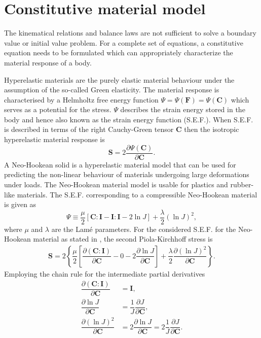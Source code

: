 \section{Constitutive material model}
\label{sec:const_law}
The kinematical relations and balance laws are not sufficient to solve a boundary value or initial value problem. For a complete set of equations, a constitutive equation needs to be formulated which can appropriately characterize the material response of a body. \par 

Hyperelastic materials are the purely elastic material behaviour under the assumption of the so-called Green elasticity. The material response is characterised by a Helmholtz free energy function $\Psi = \Psi(\mathbf{F}) = \Psi(\mathbf{C}) $ which serves as a potential for the stress. $\Psi$ describes the strain energy stored in the body and hence also known as the strain energy function (S.E.F.). When S.E.F. is described in terms of the right Cauchy-Green tensor $\mathbf{C}$ then the isotropic hyperelastic material response is 
\begin{equation}
\mathbf{S} = 2 \dfrac{\partial \Psi (\mathbf{C})}{\partial \mathbf{C}}.
\end{equation}
A Neo-Hookean solid is a hyperelastic material model that can be used for predicting the non-linear behaviour of materials undergoing large deformations under loads. The Neo-Hookean material model is usable for plastics and rubber-like materials. The S.E.F. corresponding to a compressible Neo-Hookean material is given as
\begin{equation}
\Psi \equiv \dfrac{\mu}{2} [\mathbf{C} : \mathbf{I} - \mathbf{I} : \mathbf{I} - 2 \ln J] + \dfrac{\lambda}{2} (\ln J)^2,
\label{eq:2.2}
\end{equation}
where $\mu$ and $\lambda$ are the Lam\'e parameters. For the considered S.E.F. for the Neo-Hookean material as stated in , the second Piola-Kirchhoff stress is
\begin{align}
\mathbf{S} = 2 \left\{ \dfrac{\mu}{2} \left[\dfrac{\partial (\mathbf{C} : \mathbf{I})}{\partial \mathbf{C}} - 0 - 2 \dfrac{\partial \ln J}{\partial \mathbf{C}}\right] + \dfrac{\lambda}{2} \dfrac{\partial (\ln J)^2}{\partial \mathbf{C}} \right\}.
\end{align}
Employing the chain rule for the intermediate partial derivatives
\begin{align}
\dfrac{\partial (\mathbf{C} : \mathbf{I})}{\partial \mathbf{C}} &= \mathbf{I}, \label{eq:2.4.1} \\ 
\dfrac{\partial \ln J}{\partial \mathbf{C}} &= \dfrac{1}{J} \dfrac{\partial J}{\partial \mathbf{C}}, \label{eq:2.4.2} \\ 
\dfrac{\partial (\ln J)^2}{\partial \mathbf{C}} &= 2 \dfrac{\partial \ln J}{\partial \mathbf{C}} = 2 \dfrac{1}{J} \dfrac{\partial J}{\partial \mathbf{C}}.
\label{eq:2.4.3}
\end{align}
